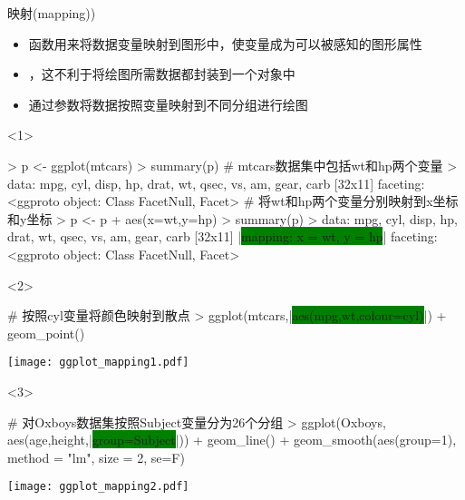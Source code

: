 \begin{frame}[t,fragile]{\subsecname}{映射(mapping))}
\begin{itemize}
\item<1-> 函数用来将数据变量映射到图形中，使变量成为可以被感知的图形属性
\item<1-> ，这不利于将绘图所需数据都封装到一个对象中
\item<3-> 通过参数将数据按照变量映射到不同分组进行绘图
\end{itemize}

\begin{onlyenv}<1>
\begin{rcode}
> p <- ggplot(mtcars)
> summary(p)
# mtcars数据集中包括wt和hp两个变量
> data: mpg, cyl, disp, hp, drat, wt, qsec, vs, am, gear, carb [32x11]
  faceting: <ggproto object: Class FacetNull, Facet>
# 将wt和hp两个变量分别映射到x坐标和y坐标
> p <- p + aes(x=wt,y=hp)
> summary(p)
> data: mpg, cyl, disp, hp, drat, wt, qsec, vs, am, gear, carb [32x11]
  |\colorbox{green}{mapping:  x = wt, y = hp}|
  faceting: <ggproto object: Class FacetNull, Facet>
\end{rcode}
\end{onlyenv}

\begin{onlyenv}<2>
\begin{minipage}{\textwidth}
\begin{rcode}
# 按照cyl变量将颜色映射到散点 
> ggplot(mtcars,|\colorbox{green}{aes(mpg,wt,colour=cyl)}|) + geom_point()
\end{rcode}
\end{minipage}

\begin{minipage}{\textwidth}
\centering
\texttt{[image: ggplot\_mapping1.pdf]}
\end{minipage}
\end{onlyenv}

\begin{onlyenv}<3>
\begin{minipage}{\textwidth}
\begin{rcode}
# 对Oxboys数据集按照Subject变量分为26个分组
> ggplot(Oxboys, aes(age,height,|\colorbox{green}{group=Subject}|)) + geom_line() +
     geom_smooth(aes(group=1), method = "lm", size = 2, se=F)
\end{rcode}
\end{minipage}

\begin{minipage}{\textwidth}
\centering
\texttt{[image: ggplot\_mapping2.pdf]}
\end{minipage}
\end{onlyenv}
\end{frame}

